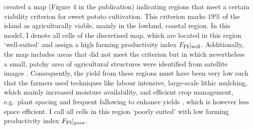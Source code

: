 \citet{Puleston2017} created a map (Figure 4 in the publication) 
indicating regions that meet a certain viability criterion for sweet potato cultivation.
This criterion marks $19\%$ of the island as agriculturally viable, mainly in the lowland, coastal region.
In this model, I denote all cells of the discretised map, which are located in this region `well-suited' and assign a high farming productivity index $F_{\rm PI}|_{\rm well}$.
Additionally, the map includes areas that did not meet the criterion but in which nevertheless a small, patchy area of agricultural structures were identified from satellite images \citet{Puleston2017}. 
Consequently, the yield from these regions must have been very low such that the farmers used techniques like labour intensive, large-scale lithic mulching, which mainly increased moisture availability, and efficient crop management, e.g.\ plant spacing and frequent fallowing to enhance yields \citep{Louwagie2006}, which is however less space efficient.
I call all cells in this region `poorly suited' with low farming productivity index $F_{\rm PI}|_{\rm poor}$.

